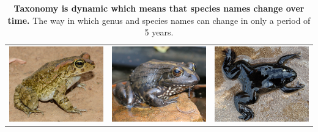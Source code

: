 \documentclass[
]{krantz}
\begin{document}
\begin{longtable}[]{@{}lll@{}}
\caption{\label{tab:taxonomy} \textbf{Taxonomy is dynamic which means that species names change over time.} The way in which genus and species names can change in only a period of 5 years.}\tabularnewline
\toprule
\includegraphics{figures/S-capensis.png} & \includegraphics{figures/A-quecketti.png} & \includegraphics{figures/X-laevis.png} \\

\end{longtable}
\end{document}
